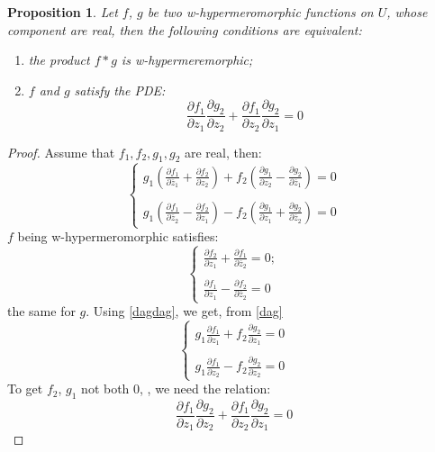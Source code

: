 \documentclass[12pt]{amsart}
\newtheorem{prop}[thm]{Proposition}
\theoremstyle{definition}
\begin{document}
\begin{prop}Let $f$, $g$ be two w-hypermeromorphic functions on $U$, whose component are real, then the following conditions are equivalent:

\begin{enumerate}
\item[$(i)$] the product $f*g$ is w-hypermeremorphic;
\item[$(ii)$] $f$ and $g$ satisfy the PDE: 
$$
\frac{\partial
f_1}{\partial z_1}\frac{\partial g_2}{\partial z_2}+\frac{\partial
f_1}{\partial z_2}\frac{\partial g_2}{\partial z_1}=0
$$ 
\end{enumerate}
\end{prop}
\begin{proof} Assume that $f_1, f_2,g_1, g_2$ are real, then: 
\begin{equation}\label{dag}
\left\{\begin{array}{l}
\displaystyle g_1(\frac{\partial
f_1}{\partial\overline z_1}+\frac{\partial f_2}{\partial z_2})+f_2(\frac{\partial g_1}{\partial z_2}-\frac{\partial g_2}{\partial\overline z_1})=0
\\ \\
\displaystyle g_1(\frac{\partial
f_1}{\partial\overline z_2}-\frac{\partial f_2}{\partial z_1})- f_2(\frac{\partial g_1}{\partial z_1}+\frac{\partial g_2}{\partial\overline z_2})=0
\end{array}\right.
\end{equation}
$f$ being w-hypermeromorphic satisfies:
\begin{equation}\label{dagdag}
\left\{\begin{array}{l}
\displaystyle\frac{\partial f_2}{\partial z_1}+\frac{\partial f_1}{\partial \overline z_2}=0;
\\ \\
\displaystyle\frac{\partial f_1}{\partial z_1}-\frac{\partial f_2}{\partial\overline z_2}=0
\end{array}\right.
\end{equation}
the same for $g$. Using \eqref{dagdag}, we get, from \eqref{dag}
$$
\left\{\begin{array}{l}
\displaystyle g_1\frac{\partial f_1}{\partial z_1}+f_2\frac{\partial g_2}{\partial z_1}=0
\\ \\
\displaystyle g_1\frac{\partial
f_1}{\partial z_2}-f_2\frac{\partial g_2}{\partial z_2}=0
\end{array}\right.
$$
To get $f_2$, $g_1$ not both 0, , we need the relation:
$$
\frac{\partial
f_1}{\partial z_1}\frac{\partial g_2}{\partial z_2}+\frac{\partial
f_1}{\partial z_2}\frac{\partial g_2}{\partial z_1}=0
$$ 
\end{proof}
\end{document}
